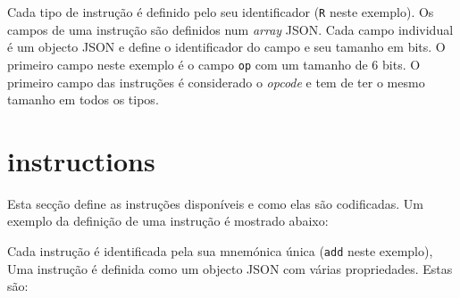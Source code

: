\documentclass[11pt,a4paper,twoside,titlepage]{report}
\begin{document}


Cada tipo de instrução é definido pelo seu identificador (\verb+R+ neste exemplo).
Os campos de uma instrução são definidos num \emph{array} JSON. Cada campo
individual é um objecto JSON e define o identificador do campo e seu tamanho em
bits. O primeiro campo neste exemplo é o campo \verb+op+ com um tamanho de 6 bits.
O primeiro campo das instruções é considerado o \emph{opcode} e tem de ter o
mesmo tamanho em todos os tipos.


\section{instructions}

Esta secção define as instruções disponíveis e como elas são codificadas.
Um exemplo da definição de uma instrução é mostrado abaixo:



Cada instrução é identificada pela sua mnemónica única (\verb+add+ neste exemplo),
Uma instrução é definida como um objecto JSON com várias propriedades. Estas são:
\end{document}
